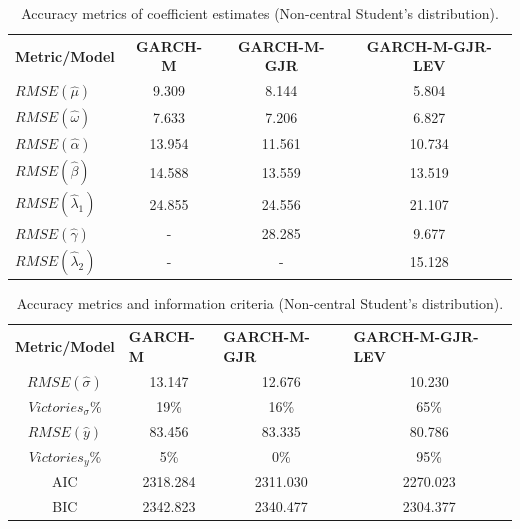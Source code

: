 \documentclass[authoryear, 1p]{elsarticle}
\numberwithin{equation}{section}
\begin{document}
\begin{table}[h]
\centering
\caption{Accuracy metrics of coefficient estimates (Non-central Student's distribution).}
\label{tab:ap_3}
\begin{tabular}{lccc}
\hline
\hline
\textbf{Metric/Model}    & \textbf{GARCH-M} & \textbf{GARCH-M-GJR} & \textbf{GARCH-M-GJR-LEV} \\

$RMSE(\hat{\mu})$        & 9.309    & 8.144    & 5.804         \\
$RMSE(\hat{\omega})$     & 7.633    & 7.206    & 6.827         \\
$RMSE(\hat{\alpha})$     & 13.954   & 11.561   & 10.734        \\
$RMSE(\hat{\beta})$      & 14.588   & 13.559   & 13.519        \\
$RMSE(\hat{\lambda}_1)$  & 24.855   & 24.556   & 21.107        \\
$RMSE(\hat{\gamma})$     & -        & 28.285   & 9.677         \\
$RMSE(\hat{\lambda}_2)$  & -        & -        & 15.128        \\       
\hline
\hline
\end{tabular}
\end{table}

\begin{table}[h]
\centering
\caption{Accuracy metrics and information criteria (Non-central Student's distribution).}
\label{tab:ap_4}
\begin{tabular}{cccc}
\hline
\hline
\textbf{Metric/Model} & \multicolumn{1}{l}{\textbf{GARCH-M}} & \multicolumn{1}{l}{\textbf{GARCH-M-GJR}} & \multicolumn{1}{l}{\textbf{GARCH-M-GJR-LEV}} \\ 

$RMSE(\hat{\sigma})$     & 13.147   & 12.676        & 10.230             \\
$Victories_{\sigma} \%$  & 19\%     & 16\%          & 65\%               \\
$RMSE(\hat{y})$          & 83.456   & 83.335        & 80.786             \\
$Victories_{y} \%$       & 5\%      & 0\%           & 95\%               \\
AIC                      & 2318.284 & 2311.030      & 2270.023           \\
BIC                      & 2342.823 & 2340.477      & 2304.377           \\
\hline
\hline
\end{tabular}
\end{table}
\end{document}
